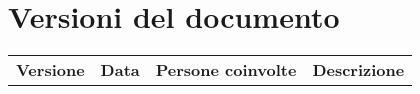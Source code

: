 \section{Versioni del documento}
\bgroup
\begin{center}
\begin{tabular}{c{1.8cm} | c{2.2cm} | c{3cm} | c{6cm}}
\hline \textbf{Versione} & \textbf{Data} & \textbf{Persone coinvolte} & \textbf{Descrizione} \\

\end{tabular}
\end{center}